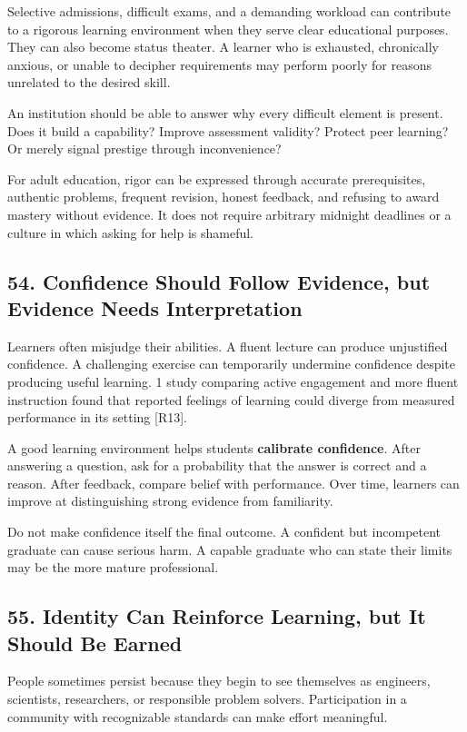 Selective admissions, difficult exams, and a demanding workload can contribute to a rigorous learning environment when they serve clear educational purposes. They can also become status theater. A learner who is exhausted, chronically anxious, or unable to decipher requirements may perform poorly for reasons unrelated to the desired skill.

An institution should be able to answer why every difficult element is present. Does it build a capability? Improve assessment validity? Protect peer learning? Or merely signal prestige through inconvenience?

For adult education, rigor can be expressed through accurate prerequisites, authentic problems, frequent revision, honest feedback, and refusing to award mastery without evidence. It does not require arbitrary midnight deadlines or a culture in which asking for help is shameful.

\subsection*{54. Confidence Should Follow Evidence, but Evidence Needs Interpretation}

Learners often misjudge their abilities. A fluent lecture can produce unjustified confidence. A challenging exercise can temporarily undermine confidence despite producing useful learning. 1 study comparing active engagement and more fluent instruction found that reported feelings of learning could diverge from measured performance in its setting [R13].

A good learning environment helps students \textbf{calibrate confidence}. After answering a question, ask for a probability that the answer is correct and a reason. After feedback, compare belief with performance. Over time, learners can improve at distinguishing strong evidence from familiarity.

Do not make confidence itself the final outcome. A confident but incompetent graduate can cause serious harm. A capable graduate who can state their limits may be the more mature professional.

\subsection*{55. Identity Can Reinforce Learning, but It Should Be Earned}

People sometimes persist because they begin to see themselves as engineers, scientists, researchers, or responsible problem solvers. Participation in a community with recognizable standards can make effort meaningful.

